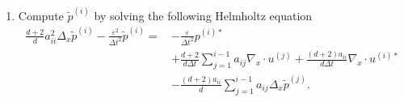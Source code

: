 \documentclass[final,11pt]{siamart251216}
\numberwithin{equation}{section}
\theoremstyle{definition}
\theoremstyle{remark}
\begin{document}
\begin{algorithm}
\begin{enumerate}
\item Compute ${\tilde p^{(i)}}$ by solving the following Helmholtz equation
\begin{equation}
\label{SecondStep}
\begin{split}
\frac{d+2}{d}  a_{ii}^2\Delta_x \tilde{p}^{(i)} - \frac{\varepsilon^2}{\Delta t^2} \tilde{p}^{(i)} = \, & -\frac{\varepsilon}{\Delta t^2 } p^{(i)*} \\
& + \frac{d+2}{d \Delta t } \sum_{j = 1}^{i-1} a_{ij} \nabla_x \cdot u^{(j)} + \frac{(d+2) a_{ii}}{d \Delta t } \nabla_x \cdot u^{(i)*} \\
& - \frac{(d+2) a_{ii}}{d } \sum_{j=1}^{i-1} a_{ij} \Delta_x \tilde{p}^{(j)}.
\end{split}
\end{equation}


\end{enumerate}
\end{algorithm}
\end{document}
